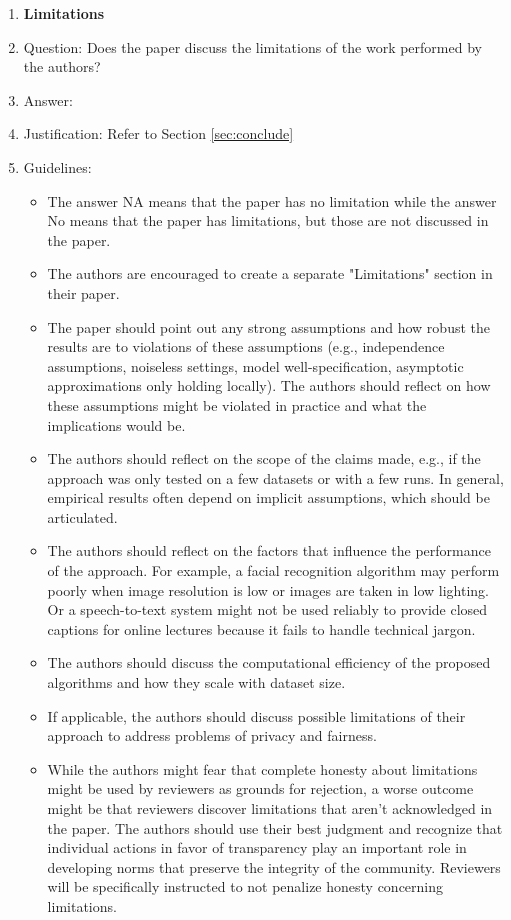 \documentclass{article}
\begin{document}
\begin{enumerate}
\item {\bf Limitations}
    \item[] Question: Does the paper discuss the limitations of the work performed by the authors?
    \item[] Answer: \answerYes{} %
    \item[] Justification: Refer to Section \ref{sec:conclude}
    \item[] Guidelines:
    \begin{itemize}
        \item The answer NA means that the paper has no limitation while the answer No means that the paper has limitations, but those are not discussed in the paper. 
        \item The authors are encouraged to create a separate "Limitations" section in their paper.
        \item The paper should point out any strong assumptions and how robust the results are to violations of these assumptions (e.g., independence assumptions, noiseless settings, model well-specification, asymptotic approximations only holding locally). The authors should reflect on how these assumptions might be violated in practice and what the implications would be.
        \item The authors should reflect on the scope of the claims made, e.g., if the approach was only tested on a few datasets or with a few runs. In general, empirical results often depend on implicit assumptions, which should be articulated.
        \item The authors should reflect on the factors that influence the performance of the approach. For example, a facial recognition algorithm may perform poorly when image resolution is low or images are taken in low lighting. Or a speech-to-text system might not be used reliably to provide closed captions for online lectures because it fails to handle technical jargon.
        \item The authors should discuss the computational efficiency of the proposed algorithms and how they scale with dataset size.
        \item If applicable, the authors should discuss possible limitations of their approach to address problems of privacy and fairness.
        \item While the authors might fear that complete honesty about limitations might be used by reviewers as grounds for rejection, a worse outcome might be that reviewers discover limitations that aren't acknowledged in the paper. The authors should use their best judgment and recognize that individual actions in favor of transparency play an important role in developing norms that preserve the integrity of the community. Reviewers will be specifically instructed to not penalize honesty concerning limitations.
    \end{itemize}


\end{enumerate}
\end{document}
